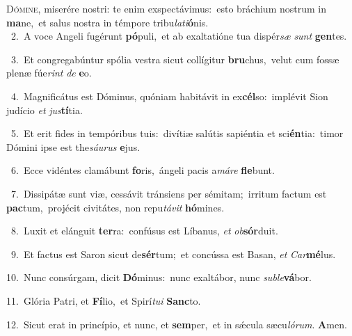 \lettrine{\initial\textcolor{\initialcolor}{D}}{ómine,} miserére nostri: te enim exspectávimus:~\dagger esto bráchium nostrum in \textbf{ma}\-ne,~\star et salus nostra in témpore tribu\-\textit{la}\-\textit{ti}\textbf{ó}nis.\\
{\numbfont\textcolor{\numbcolor}{~2.}}~A voce Angeli fugérunt \textbf{pó}\-puli,~\star et ab exaltatióne tua dispér\textit{sæ} \textit{sunt} \textbf{gen}\-tes.\par
{\numbfont\textcolor{\numbcolor}{~3.}}~Et congregabúntur spólia vestra sicut collígitur \textbf{bru}\-chus,~\star velut cum fossæ plenæ fúe\textit{rint} \textit{de} \textbf{e}\-o.\par
{\numbfont\textcolor{\numbcolor}{~4.}}~Magnificátus est Dóminus, quóniam habitávit in ex\-\textbf{cél}\-so:~\star implévit Sion judício \textit{et} \textit{jus}\-\textbf{tí}tia.\par
{\numbfont\textcolor{\numbcolor}{~5.}}~Et erit fides in tempóribus tuis:~\dagger divítiæ salútis sapiéntia et sci\-\textbf{én}\-tia:~\star timor Dómini ipse est the\-\textit{sáu}\-\textit{rus} \textbf{e}\-jus.\par
{\numbfont\textcolor{\numbcolor}{~6.}}~Ecce vidéntes clamábunt \textbf{fo}\-ris,~\star ángeli pacis a\-\textit{má}\-\textit{re} \textbf{fle}\-bunt.\par
{\numbfont\textcolor{\numbcolor}{~7.}}~Dissipátæ sunt viæ, cessávit tránsiens per sémitam;~\dagger irritum factum est \textbf{pac}\-tum,~\star projécit civitátes, non repu\-\textit{tá}\-\textit{vit} \textbf{hó}\-mines.\par
{\numbfont\textcolor{\numbcolor}{~8.}}~Luxit et elánguit \textbf{ter}\-ra:~\star confúsus est Líbanus, \textit{et} \textit{ob}\-\textbf{sór}duit.\par
{\numbfont\textcolor{\numbcolor}{~9.}}~Et factus est Saron sicut de\-\textbf{sér}\-tum;~\star et concússa est Basan, \textit{et} \textit{Car}\-\textbf{mé}lus.\par
{\numbfont\textcolor{\numbcolor}{10.}}~Nunc consúrgam, dicit \textbf{Dó}\-minus:~\star nunc exaltábor, nunc \textit{sub}\-\textit{le}\textbf{vá}bor.\par
{\numbfont\textcolor{\numbcolor}{11.}}~Glória Patri, et \textbf{Fí}\-lio,~\star et Spirí\-\textit{tu}\-\textit{i} \textbf{Sanc}\-to.\par
{\numbfont\textcolor{\numbcolor}{12.}}~Sicut erat in princípio, et nunc, et \textbf{sem}\-per,~\star et in sǽcula sæcu\-\textit{ló}\-\textit{rum}. \textbf{A}\-men.\par
